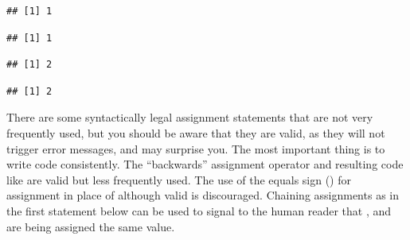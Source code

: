 \documentclass[krantz2]{krantz}\usepackage{knitr}
\begin{document}
\begin{knitrout}\footnotesize
{}\color{fgcolor}\begin{kframe}
\begin{alltt}
\end{alltt}
\begin{verbatim}
## [1] 1
\end{verbatim}
\begin{alltt}
\end{alltt}
\begin{verbatim}
## [1] 1
\end{verbatim}
\begin{alltt}
 \hlopt{+} 
\end{alltt}
\begin{verbatim}
## [1] 2
\end{verbatim}
\begin{alltt}
 \hlopt{+} \hlstd{)}
\end{alltt}
\begin{verbatim}
## [1] 2
\end{verbatim}
\end{kframe}
\end{knitrout}
\begin{playground}
There are some syntactically legal assignment statements that are not very frequently used, but you should be aware that they are valid, as they will not trigger error messages, and may surprise you. The most important thing is to write code consistently. The ``backwards'' assignment operator \Roperator{->} and resulting code like  are valid but less frequently used. The use of the equals sign (\Roperator{=}) for assignment in place of \Roperator{<-} although valid is discouraged. Chaining assignments as in the first statement below can be used to signal to the human reader that ,  and  are being assigned the same value.

\begin{knitrout}\footnotesize
{}\color{fgcolor}\begin{kframe}
\begin{alltt}
 \hlkwb{<-}  \hlkwb{<-}  \hlkwb{<-} 
 \hlkwb{->} 
 \hlkwb{=} 
\end{alltt}
\end{kframe}
\end{knitrout}

\end{playground}
\end{document}
